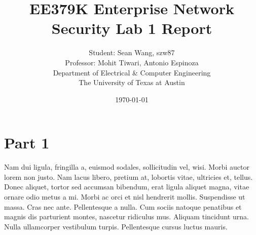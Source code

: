 \documentclass[11pt]{article}
\author{Student: Sean Wang, szw87 \\ Professor: Mohit Tiwari, Antonio Espinoza \\ Department of Electrical \& Computer Engineering \\ The University of Texas at Austin}
\date{\today}
\title{EE379K Enterprise Network Security Lab 1 Report}
\begin{document}
\maketitle
\section*{Part 1}
\label{sec:prob-1}
Nam dui ligula, fringilla a, euismod sodales, sollicitudin vel, wisi. Morbi
auctor lorem non justo. Nam lacus libero, pretium at, lobortis vitae, ultricies
et, tellus. Donec aliquet, tortor sed accumsan bibendum, erat ligula aliquet
magna, vitae ornare odio metus a mi. Morbi ac orci et nisl hendrerit mollis.
Suspendisse ut massa. Cras nec ante. Pellentesque a nulla. Cum sociis natoque
penatibus et magnis dis parturient montes, nascetur ridiculus mus. Aliquam
tincidunt urna. Nulla ullamcorper vestibulum turpis. Pellentesque cursus luctus
mauris.
\end{document}
